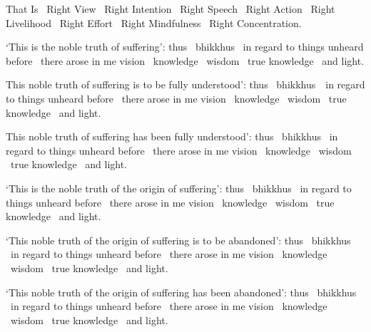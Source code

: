 \begin{english-hang}
  That Is \breathmark\ Right View \breathmark\ Right Intention \breathmark\ Right Speech \breathmark\ Right Action \breathmark\ Right Livelihood \breathmark\ Right Effort \breathmark\ Right Mindfulness \breathmark\ Right Concentration.
\end{english-hang}

\begin{english-hang}
  `This is the noble truth of suffering': thus \breathmark\ bhikkhus \breathmark\ in regard to things unheard before \breathmark\ there arose in me vision \breathmark\ knowledge \breathmark\ wisdom \breathmark\ true knowledge \breathmark\ and light.
\end{english-hang}

\begin{english-hang}
  This noble truth of suffering is to be fully understood': thus \breathmark\ \mbox{bhikkhus}~\breathmark\ in regard to things unheard before \breathmark\ there arose in me vision \breathmark\ knowledge \breathmark\ wisdom \breathmark\ true knowledge \breathmark\ and light.
\end{english-hang}

\begin{english-hang}
  This noble truth of suffering has been fully understood': thus \breathmark\ bhikkhus \breathmark\ in regard to things unheard before \breathmark\ there arose in me vision \breathmark\ knowledge \breathmark\ wisdom \breathmark\ true knowledge \breathmark\ and light.
\end{english-hang}

\begin{english-hang}
  `This is the noble truth of the origin of suffering': thus \breathmark\ bhikkhus \breathmark\ in regard to things unheard before \breathmark\ there arose in me vision \breathmark\ knowledge \breathmark\ wisdom \breathmark\ true knowledge \breathmark\ and light.
\end{english-hang}

\begin{english-hang}
  `This noble truth of the origin of suffering is to be abandoned': thus \breathmark\ bhikkhus \breathmark\ in regard to things unheard before \breathmark\ there arose in me vision \breathmark\ knowledge \breathmark\ wisdom \breathmark\ true knowledge \breathmark\ and light.
\end{english-hang}

\begin{english-hang}
  `This noble truth of the origin of suffering has been abandoned': thus \breathmark\ bhikkhus \breathmark\ in regard to things unheard before \breathmark\ there arose in me vision \breathmark\ knowledge \breathmark\ wisdom \breathmark\ true knowledge \breathmark\ and light.
\end{english-hang}

